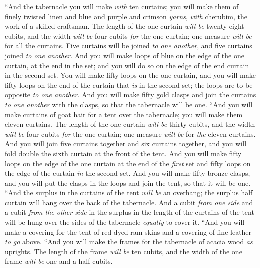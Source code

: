 \begin{biblechapter} %
 “And the tabernacle you will make \textit{with} ten curtains; you will make them of finely twisted linen and blue and purple and crimson \textit{yarns}, \textit{with} cherubim, the work of a skilled craftsman.
\verse The length of the one curtain \textit{will be} twenty-eight cubits, and the width \textit{will be} four cubits \textit{for} the one curtain; one measure \textit{will be} for all the curtains.
\verse Five curtains will be joined \textit{to one another}, and five curtains joined \textit{to one another}.
\verse And you will make loops of blue on the edge of the one curtain, at the end in the set; and you will do so on the edge of the end curtain in the second set.
\verse You will make fifty loops on the one curtain, and you will make fifty loops on the end of the curtain that \textit{is} in the second set; the loops are to be opposite \textit{to one another}.
\verse And you will make fifty gold clasps and join the curtains \textit{to one another} with the clasps, so that the tabernacle will be one.
\verse “And you will make curtains of goat hair for a tent over the tabernacle; you will make them eleven curtains.
\verse The length of the one curtain \textit{will be} thirty cubits, and the width \textit{will be} four cubits \textit{for} the one curtain; one measure \textit{will be} for \textit{the} eleven curtains.
\verse And you will join five curtains together and six curtains together, and you will fold double the sixth curtain at the front of the tent.
\verse And you will make fifty loops on the edge of the one curtain at the end of the \textit{first} set and fifty loops on the edge of the curtain \textit{in} the second set.
\verse And you will make fifty bronze clasps, and you will put the clasps in the loops and join the tent, so that it will be one.
\verse “And the surplus in the curtains of the tent \textit{will be} an overhang; the surplus half curtain will hang over the back of the tabernacle.
\verse And a cubit \textit{from one side} and a cubit \textit{from the other side} in the surplus in the length of the curtains of the tent will be hung over the sides of the tabernacle \textit{equally} to cover it.
\verse “And you will make a covering for the tent of red-dyed ram skins and a covering of fine leather \textit{to go} above.
\verse “And you will make the frames for the tabernacle of acacia wood \textit{as} uprights.
\verse The length of the frame \textit{will be} ten cubits, and the width of the one frame \textit{will be} one and a half cubits.

\end{biblechapter}
